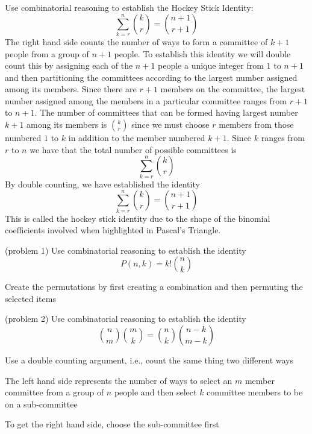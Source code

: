 \documentclass[handout]{ximera}
\begin{document}
\begin{example}[example 5]
Use combinatorial reasoning to establish the Hockey Stick Identity:
\[
\sum_{k=r}^{n}\binom{k}{r}=\binom{n+1}{r+1} %
\]
The right hand side counts the number of ways to form a committee of $k+1$ people from a group of $n+1$ people.
To establish this identity we will double count this by assigning each of the $n+1$ people a unique 
integer from $1$ to $n+1$ and then partitioning the committees according to the largest number 
assigned among its members.
Since there are $r+1$ members on the committee, the largest number assigned among the 
members in a particular committee ranges from $r+1$ to $n+1$.
The number of committees that can be formed having largest number $k+1$ among its members
is $\binom{k}{r}$ since we must choose
$r$  members from those numbered $1$ to $k$ in addition to the member numbered $k+1$. 
Since $k$ ranges 
from $r$ to $n$ we have that the total number of possible committees is
\[
\sum_{k=r}^{n}\binom{k}{r}
\]
By double counting, we have established the identity
\[
\sum_{k=r}^{n}\binom{k}{r}=\binom{n+1}{r+1}
\]
This is called the hockey stick identity due to the shape of the binomial 
coefficients involved when highlighted in Pascal's Triangle.
\end{example}


\begin{problem}(problem 1)
Use combinatorial reasoning to establish the identity
\[
P(n,k) = k!\binom{n}{k}
\]
\begin{hint}
Create the permutations by first creating a combination and then permuting the selected items
\end{hint}
\end{problem}

\begin{problem}(problem 2)
Use combinatorial reasoning to establish the identity
\[
\binom{n}{m} \binom{m}{k} = \binom{n}{k} \binom{n-k}{m-k}
\]
\begin{hint}
Use a double counting argument, i.e., count the same thing two different ways
\end{hint}
\begin{hint}
The left hand side represents the number of ways to select an $m$ member committee from a group of $n$ people and then 
select $k$ committee members to be on a sub-committee
\end{hint}

\begin{hint}
To get the right hand side, choose the sub-committee first
\end{hint}
\end{problem}
\end{document}
